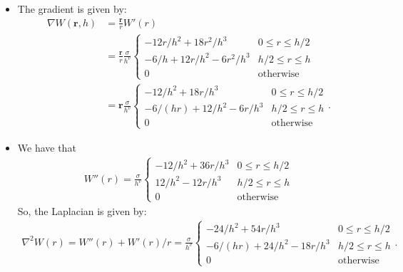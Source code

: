 \documentclass[10pt]{article}
\newcommand{\ve}[1]{\mathbf{#1}}
\begin{document}
\begin{itemize}
    \item The gradient is given by:
    \begin{align*}
      \nabla W(\ve{r}, h) 
      &= \frac{\ve{r}}{r} W'(r)\\
      &= \frac{\ve{r}}{r} \frac{\sigma}{h^v} \begin{cases}
        -12 r / h^2 + 18r^2 /h^3 & 0 \leq r \leq h/2\\
        - 6/h + 12r/h^2 - 6r^2/h^3 & h/2 \leq r \leq h\\
        0 & \mathrm{otherwise}
      \end{cases}\\
      &= \ve{r} \frac{\sigma}{h^v} \begin{cases}
        -12/ h^2 + 18r /h^3 & 0 \leq r \leq h/2\\
        -6/(hr) + 12/h^2 - 6r/h^3 & h/2 \leq r \leq h\\
        0 & \mathrm{otherwise}
      \end{cases}.
    \end{align*}

    \item We have that
    \begin{align*}
      W''(r) = \frac{\sigma}{h^v} \begin{cases}
        -12/ h^2 + 36r /h^3 & 0 \leq r \leq h/2\\
        12/h^2 - 12r/h^3 & h/2 \leq r \leq h\\
        0 & \mathrm{otherwise}
      \end{cases}
    \end{align*}
    So, the Laplacian is given by:
    \begin{align*}
      \nabla^2 W(r) = W''(r) + W'(r)/r = \frac{\sigma}{h^v} \begin{cases}
        -24/ h^2 + 54r /h^3 & 0 \leq r \leq h/2\\
        -6/(hr) + 24/h^2 - 18r/h^3 & h/2 \leq r \leq h\\
        0 & \mathrm{otherwise}
      \end{cases}.
    \end{align*}
  \end{itemize}

  
   
\end{document}
